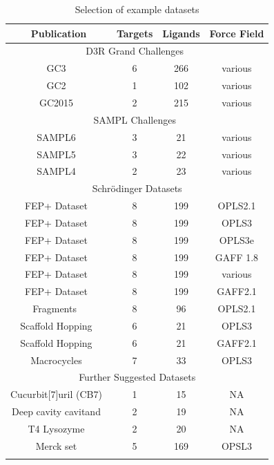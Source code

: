 \documentclass[9pt,bestpractices]{livecoms}
\begin{document}
\begin{table}
\caption{Selection of example datasets}
\begin{tabular}{cccc}
\textbf{Publication} & \textbf{Targets} & \textbf{Ligands} & \textbf{Force Field} \\
\hline
\multicolumn{4}{|c|}{D3R Grand Challenges~\cite{D3R}} \\
\hline
GC3~\cite{gaieb2019d3r} & 6 & 266 & various \\
GC2~\cite{gaieb2018d3r} & 1 & 102 & various \\
GC2015~\cite{gathiaka2016d3r} & 2 & 215 & various \\
\hline
\multicolumn{4}{|c|}{SAMPL Challenges~\cite{SAMPL}} \\
\hline
SAMPL6~\cite{rizzi2018overview} & 3 & 21 & various \\
SAMPL5~\cite{yin2017overview} & 3 & 22 & various \\
SAMPL4~\cite{muddana2014sampl4} & 2 & 23 & various \\
\hline
\multicolumn{4}{|c|}{Schrödinger Datasets} \\
\hline
FEP+ Dataset~\cite{wang2015accurate} & 8 & 199 & OPLS2.1 \\
FEP+ Dataset~\cite{harder2016opls3} & 8 & 199 & OPLS3 \\
FEP+ Dataset~\cite{roos2019opls3e} & 8 & 199 & OPLS3e \\
FEP+ Dataset~\cite{song2019using} & 8 & 199 & GAFF 1.8 \\
FEP+ Dataset~\cite{gapsys2020large} & 8 & 199 & various \\
FEP+ Dataset~\cite{kuhn2020assessment} & 8 & 199 & GAFF2.1 \\
Fragments ~\cite{steinbrecher2015accurate} & 8 & 96 & OPLS2.1 \\
Scaffold Hopping~\cite{wang2017accurate} & 6 & 21 & OPLS3 \\
Scaffold Hopping~\cite{kuhn2020assessment} & 6 & 21 & GAFF2.1 \\
Macrocycles~\cite{yu2017accurate} & 7 & 33 & OPLS3 \\
\hline
\multicolumn{4}{|c|}{Further Suggested Datasets} \\
\hline
Cucurbit[7]uril (CB7)~\cite{mobley2017predicting} & 1 & 15 & NA \\
Deep cavity cavitand~\cite{mobley2017predicting} & 2 & 19 & NA \\
T4 Lysozyme~\cite{mobley2017predicting} & 2 & 20 & NA \\
Merck set~\cite{MCompChem2019Sep} & 5 & 169 & OPSL3 \\

\hline
\label{tab:benchmarks}
\end{tabular}
\end{table}
\end{document}
